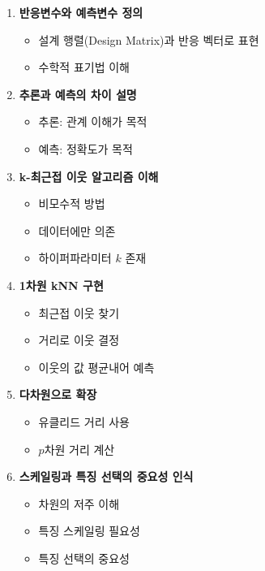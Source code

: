 \documentclass[12pt,a4paper]{article}
\begin{document}
\begin{enumerate}
    \item \textbf{반응변수와 예측변수 정의}
    \begin{itemize}
        \item 설계 행렬(Design Matrix)과 반응 벡터로 표현
        \item 수학적 표기법 이해
    \end{itemize}

    \item \textbf{추론과 예측의 차이 설명}
    \begin{itemize}
        \item 추론: 관계 이해가 목적
        \item 예측: 정확도가 목적
    \end{itemize}

    \item \textbf{k-최근접 이웃 알고리즘 이해}
    \begin{itemize}
        \item 비모수적 방법
        \item 데이터에만 의존
        \item 하이퍼파라미터 $k$ 존재
    \end{itemize}

    \item \textbf{1차원 kNN 구현}
    \begin{itemize}
        \item 최근접 이웃 찾기
        \item 거리로 이웃 결정
        \item 이웃의 값 평균내어 예측
    \end{itemize}

    \item \textbf{다차원으로 확장}
    \begin{itemize}
        \item 유클리드 거리 사용
        \item $p$차원 거리 계산
    \end{itemize}

    \item \textbf{스케일링과 특징 선택의 중요성 인식}
    \begin{itemize}
        \item 차원의 저주 이해
        \item 특징 스케일링 필요성
        \item 특징 선택의 중요성
    \end{itemize}
\end{enumerate}
\end{document}
